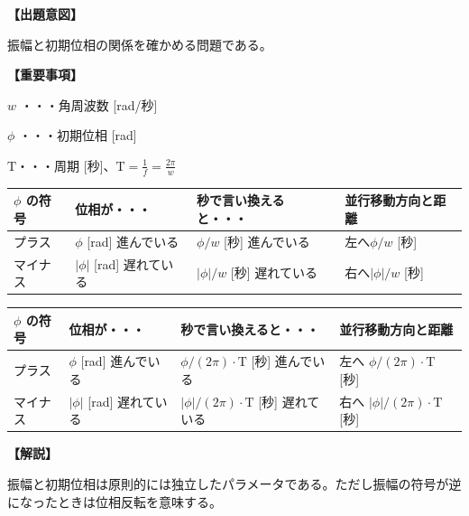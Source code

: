 \noindent \textbf{【出題意図】}

\noindent 振幅と初期位相の関係を確かめる問題である。

\vspace{1em}
\noindent \textbf{【重要事項】}

\bigskip
\noindent $w$ ・・・角周波数 [rad/秒]

\bigskip
\noindent $\phi$ ・・・初期位相 [rad]

\bigskip
$\textrm{T}$・・・周期 [秒]、$\textrm{T} = \frac{1}{f} = \frac{2\pi}{w}$

\begin{center}
\begin{tabularx}{0.9\fbwidth}{|X|X|X|X|}
\hline
$\phi$ の符号&  位相が・・・   & 秒で言い換えると・・・   & 並行移動方向と距離 \\
\hline
プラス &  $\phi$ [rad] 進んでいる & $\phi/w$ [秒] 進んでいる & 左へ$\phi/w$ [秒] \\
\hline
マイナス &  $|\phi|$ [rad] 遅れている & $|\phi|/w$ [秒] 遅れている & 右へ$|\phi|/w$ [秒] \\
\hline
\end{tabularx}

\medskip
\begin{tabularx}{0.9\fbwidth}{|X|X|X|X|}
\hline
$\phi$ の符号&  位相が・・・   & 秒で言い換えると・・・   & 並行移動方向と距離 \\
\hline
プラス &  $\phi$ [rad] 進んでいる & $\phi/(2\pi) \cdot \textrm{T}$ [秒] 進んでいる & 左へ $\phi/(2\pi) \cdot \textrm{T}$ [秒] \\
\hline
マイナス &  $|\phi|$ [rad] 遅れている & $|\phi|/(2\pi) \cdot \textrm{T}$ [秒] 遅れている & 右へ $|\phi|/(2\pi) \cdot \textrm{T}$ [秒] \\
\hline
\end{tabularx}
\end{center}

\vspace{1em}
\noindent \textbf{【解説】}

\noindent 振幅と初期位相は原則的には独立したパラメータである。ただし振幅の符号が逆になったときは位相反転を意味する。

